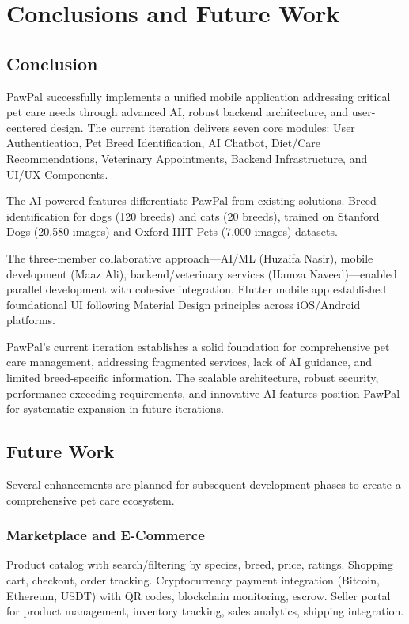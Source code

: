 \chapter{Conclusions and Future Work}

\section{Conclusion}

PawPal successfully implements a unified mobile application addressing critical pet care needs through advanced AI, robust backend architecture, and user-centered design. The current iteration delivers seven core modules: User Authentication, Pet Breed Identification, AI Chatbot, Diet/Care Recommendations, Veterinary Appointments, Backend Infrastructure, and UI/UX Components.

The AI-powered features differentiate PawPal from existing solutions. Breed identification for dogs (120 breeds) and  cats (20 breeds), trained on Stanford Dogs (20,580 images) and Oxford-IIIT Pets (7,000 images) datasets. 


The three-member collaborative approach—AI/ML (Huzaifa Nasir), mobile development (Maaz Ali), backend/veterinary services (Hamza Naveed)—enabled parallel development with cohesive integration. Flutter mobile app established foundational UI following Material Design principles across iOS/Android platforms.

PawPal's current iteration establishes a solid foundation for comprehensive pet care management, addressing fragmented services, lack of AI guidance, and limited breed-specific information. The scalable architecture, robust security, performance exceeding requirements, and innovative AI features position PawPal for systematic expansion in future iterations.

\section{Future Work}

Several enhancements are planned for subsequent development phases to create a comprehensive pet care ecosystem.

\subsection{Marketplace and E-Commerce}

Product catalog with search/filtering by species, breed, price, ratings. Shopping cart, checkout, order tracking. Cryptocurrency payment integration (Bitcoin, Ethereum, USDT) with QR codes, blockchain monitoring, escrow. Seller portal for product management, inventory tracking, sales analytics, shipping integration.

